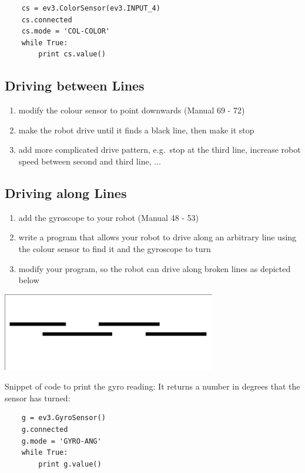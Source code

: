 \documentclass{article}
\begin{document}
  \begin{verbatim}
    cs = ev3.ColorSensor(ev3.INPUT_4)
    cs.connected
    cs.mode = 'COL-COLOR'
    while True:
        print cs.value()
  \end{verbatim}

  \subsection{Driving between Lines}
  \begin{enumerate}
      \item modify the colour sensor to point downwards (Manual 69 - 72)
      \item make the robot drive until it finds a black line, then make it stop
      \item add more complicated drive pattern, e.g.\ stop at the third line, increase
          robot speed between second and third line, ...
  \end{enumerate}

  \subsection{Driving along Lines}
  \begin{enumerate}
    \item add the gyroscope to your robot (Manual 48 - 53)
    \item write a program that allows your robot to drive along an arbitrary line using 
        the colour sensor to find it and the gyroscope to turn
    \item modify your program, so the robot can drive along broken lines as depicted below
  \end{enumerate}

  \begin{center}
      \includegraphics[width=0.7\textwidth]{broken_line}
  \end{center}
  
  Snippet of code to print the gyro reading: It returns a number in degrees that
  the sensor has turned: \\
  \begin{verbatim}
    g = ev3.GyroSensor()
    g.connected
    g.mode = 'GYRO-ANG'
    while True:
        print g.value()
  \end{verbatim}
  
\end{document}
